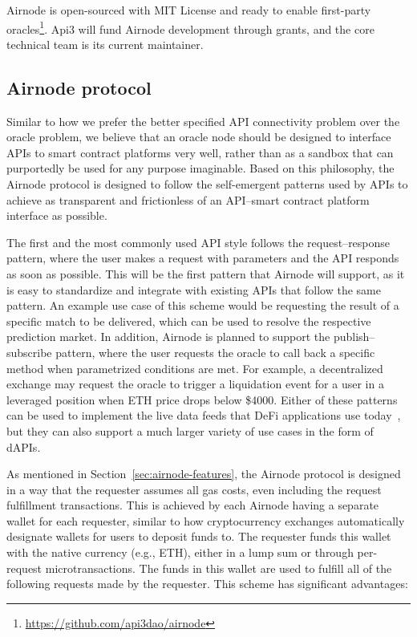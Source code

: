 \documentclass[11pt]{article}
\begin{document}
Airnode is open-sourced with MIT License and ready to enable first-party oracles\footnote{\url{https://github.com/api3dao/airnode}}.
Api3 will fund Airnode development through grants, and the core technical team is its current maintainer.

\subsection{Airnode protocol}
\label{sec:airnode-protocol}

Similar to how we prefer the better specified API connectivity problem over the oracle problem, we believe that an oracle node should be designed to interface APIs to smart contract platforms very well, rather than as a sandbox that can purportedly be used for any purpose imaginable.
Based on this philosophy, the Airnode protocol is designed to follow the self-emergent patterns used by APIs to achieve as transparent and frictionless of an API--smart contract platform interface as possible.

The first and the most commonly used API style follows the request--response pattern, where the user makes a request with parameters and the API responds as soon as possible.
This will be the first pattern that Airnode will support, as it is easy to standardize and integrate with existing APIs that follow the same pattern.
An example use case of this scheme would be requesting the result of a specific match to be delivered, which can be used to resolve the respective prediction market.
In addition, Airnode is planned to support the publish--subscribe pattern, where the user requests the oracle to call back a specific method when parametrized conditions are met.
For example, a decentralized exchange may request the oracle to trigger a liquidation event for a user in a leveraged position when ETH price drops below \$4000.
Either of these patterns can be used to implement the live data feeds that DeFi applications use today~\cite{liu:2020}, but they can also support a much larger variety of use cases in the form of dAPIs.

As mentioned in Section~\ref{sec:airnode-features}, the Airnode protocol is designed in a way that the requester assumes all gas costs, even including the request fulfillment transactions.
This is achieved by each Airnode having a separate wallet for each requester, similar to how cryptocurrency exchanges automatically designate wallets for users to deposit funds to.
The requester funds this wallet with the native currency (e.g., ETH), either in a lump sum or through per-request microtransactions.
The funds in this wallet are used to fulfill all of the following requests made by the requester.
This scheme has significant advantages:
\end{document}
